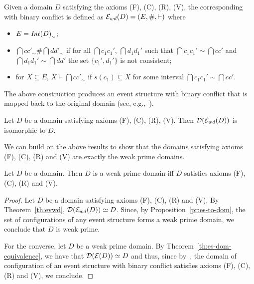 \begin{definition}
  \label{de:evwd}
  Given a domain $D$ satisfying the axioms (F), (C), (R), (V), the
  corresponding {\esabbr} with binary conflict is defined as
  $\mathcal{E}_{wd}({D}) = (E, \#, \vdash)$ where
  \begin{itemize}
    
  \item
    $E = {\mathop{\mathit{Int}({D})}}_{\scriptscriptstyle {\sim}}$;
  \item $\dint{c}{c'}_\sim \# \dint{d}{d'}_\sim$ if for all
    $\dint{c_1}{c_1'}$, $\dint{d_1}{d_1'}$ such that
    $\dint{c_1}{c_1'} \sim \dint{c}{c'}$ and
    $\dint{d_1}{d_1'} \sim \dint{d}{d'}$ the set $\{c_1',d_1'\}$ is
    not consistent;
    
  \item 
    for $X \subseteq E$, $X \vdash \dint{c}{c'}_\sim$ if
    $s(c_1) \subseteq X$ for some interval
    $\dint{c_1}{c_1'} \sim \dint{c}{c'}$.
  \end{itemize}
\end{definition}

The above construction produces an event structure with binary conflict that is mapped back to the original domain (see, e.g.,~\cite[Corollary 2.10]{Dro:ESD}).

\begin{theorem}
  \label{th:evwd}
  Let $D$ be a domain satisfying axioms (F), (C), (R), (V). Then
  $\mathcal{D}({\mathcal{E}_{wd}({D})})$ is isomorphic to $D$.
\end{theorem}



We can build on the above results to show that the domains satisfying
axioms (F), (C), (R) and (V) are exactly the weak prime domains.

\begin{proposition}
  Let $D$ be a domain. Then $D$ is a weak prime domain iff $D$
  satisfies axioms (F), (C), (R) and (V).
\end{proposition}

\begin{proof}
  Let $D$ be a domain satisfying axioms (F), (C), (R) and (V).  By
  Theorem~\ref{th:evwd}, $\mathcal{D}({\mathcal{E}_{wd}({D})}) \simeq D$. Since, by
  Proposition~\ref{pr:es-to-dom}, the set of configurations of any
  event structure forms a weak prime domain, we conclude that $D$ is
  weak prime.

  For the converse, let $D$ be a weak prime domain. By
  Theorem~\ref{th:es-dom-equivalence}, we have that
  $\mathcal{D}({\mathcal{E}({D})}) \simeq D$ and thus, since by~\cite{Winskel:phd,Dro:ESD},
  the domain of configuration of an event structure with binary
  conflict satisfies axioms (F), (C), (R) and (V), we conclude.
\end{proof}


